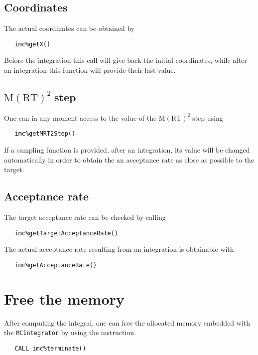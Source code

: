 \documentclass[11pt,a4paper,twoside]{article}
\newcommand{\MRTWO}{$ \text{M}(\text{RT})^2 \;$}
\begin{document}
\subsection{Coordinates} %
\label{sub:coordinates}
The actual coordinates can be obtained by
\begin{verbatim}
   imc%getX()
\end{verbatim}
Before the integration this call will give back the initial coordinates, while after an integration this function will provide their last value.

\subsection{\MRTWO step} %
\label{sub:_mrtwo_step}
One can in any moment access to the value of the \MRTWO step using
\begin{verbatim}
   imc%getMRT2Step()
\end{verbatim}
If a sampling function is provided, after an integration, its value will be changed automatically in order to obtain the an acceptance rate as close as possible to the target.

\subsection{Acceptance rate} %
\label{sub:acceptance_rate}
The target acceptance rate can be checked by calling
\begin{verbatim}
   imc%getTargetAcceptanceRate()
\end{verbatim}

The actual acceptance rate resulting from an integration is obtainable with
\begin{verbatim}
   imc%getAcceptanceRate()
\end{verbatim}



\section{Free the memory} %
\label{sec:free_the_memory}
After computing the integral, one can free the allocated memory embedded with the \verb+MCIntegrator+ by using the instruction
\begin{verbatim}
   CALL imc%terminate()
\end{verbatim}
\end{document}
